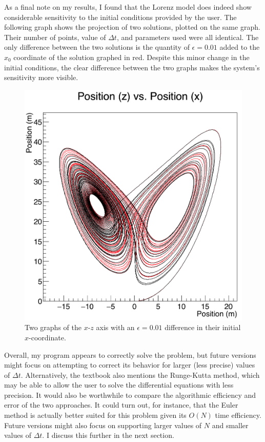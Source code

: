 \documentclass[12pt]{amsart}
\begin{document}
As a final note on my results, I found that the Lorenz model does indeed show considerable sensitivity to the initial conditions provided by the
user. The following graph shows the projection of two solutions, plotted on the same graph. Their number of points, value of $\Delta t$, and
parameters used were all identical. The only difference between the two solutions is the quantity of $\epsilon = 0.01$ added to the $x_0$
coordinate of the solution graphed in red. Despite this minor change in the initial conditions, the clear difference between the two graphs 
makes the system's sensitivity more visible.
\begin{figure}[h]
	\begin{center}
		\includegraphics[scale=0.33]{fig-3.png}
	\end{center}
	\caption{Two graphs of the $x$-$z$ axis with an $\epsilon = 0.01$ difference in their initial $x$-coordinate.}
\end{figure}

Overall, my program appears to correctly solve the problem, but future versions might focus on attempting to correct its behavior for larger
(less precise) values of $\Delta t$. Alternatively, the textbook also mentions the Runge-Kutta method, which may be able to allow the user to
solve the differential equations with less precision. It would also be worthwhile to compare the algorithmic efficiency and error of the two
approaches. It could turn out, for instance, that the Euler method is actually better suited for this problem given its $O(N)$ time efficiency. 
Future versions might also focus on supporting larger values of $N$ and smaller values of $\Delta t$. I discuss this further in the next section.
\end{document}
